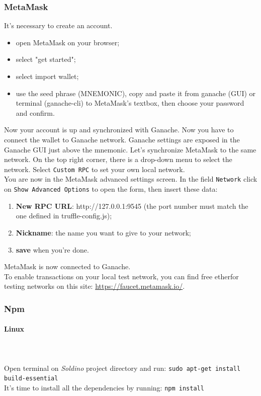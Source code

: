 \subsubsection{MetaMask}
It's necessary to create an account.
\begin{itemize}
	\item open MetaMask on your browser;
	\item select "get started";
	\item select import wallet;
	\item use the seed phrase (MNEMONIC), copy and paste it from ganache (GUI) or terminal (ganache-cli) to MetaMask's textbox, then choose your password and confirm.
\end{itemize}
Now your account is up and synchronized with Ganache.
Now you have to connect the wallet to Ganache network. Ganache settings are exposed in the Ganache GUI just above the mnemonic.
Let's synchronize MetaMask to the same network. On the top right corner, there is a drop-down menu to select the network. Select \texttt{Custom RPC} to set your own local network.\\
You are now in the MetaMask advanced settings screen. In the field \texttt{Network} click on \texttt{Show Advanced Options} to open the form, then insert these data:
\begin{enumerate}
	\item \textbf{New RPC URL}: http://127.0.0.1:9545 (the port number must match the one defined in truffle-config.js);
	\item \textbf{Nickname}: the name you want to give to your network;
	\item \textbf{save} when you're done.
\end{enumerate}
MetaMask is now connected to Ganache.\\

\noindent To enable transactions on your local test network, you can find free ether\glosp for testing networks on this site: \href{https://faucet.metamask.io/}{https://faucet.metamask.io/}.

\subsubsection{Npm}
\paragraph{Linux} \mbox{} \\ \mbox{} \\
Open terminal on \textit{Soldino} project directory and run:
\texttt{sudo apt-get install build-essential} \\
It's time to install all the dependencies by running: \texttt{npm install}

